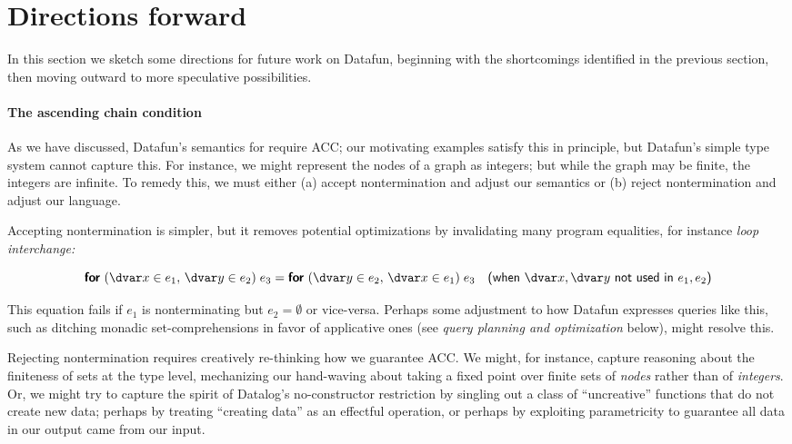 
\section{Directions forward}

\label{section-extensions}

In this section we sketch some directions for future work on Datafun, beginning with the shortcomings identified in the previous section, then moving outward to more speculative possibilities.

\paragraph{The ascending chain condition}

As we have discussed, Datafun's semantics for  require ACC; our motivating examples satisfy this in principle, but Datafun's simple type system cannot capture this. For instance, we might represent the nodes of a graph as integers; but while the graph may be finite, the integers are infinite. To remedy this, we must either (a) accept nontermination and adjust our semantics or (b) reject nontermination and adjust our language.

Accepting nontermination is simpler, but it removes potential optimizations by invalidating many program equalities, for instance \emph{loop interchange:}

\begin{equation*}
  \efor{\dvar x \in e_1,\, \dvar y \in e_2}{e_3}
  =
  \efor{\dvar y \in e_2,\, \dvar x \in e_1}{e_3}
  \quad\textsf{(when $\dvar x,\dvar y$ not used in $e_1,e_2$)}
\end{equation*}



\noindent
This equation fails if $e_1$ is nonterminating but $e_2 = \emptyset$ or
vice-versa. Perhaps some adjustment to how Datafun expresses queries like this, such as ditching monadic set-comprehensions in favor of applicative ones (see \emph{query planning and optimization} below), might resolve this.

Rejecting nontermination requires creatively re-thinking how we guarantee ACC.
We might, for instance, capture reasoning about the finiteness of sets at the
type level, mechanizing our hand-waving about taking a fixed point over finite
sets of \emph{nodes} rather than of \emph{integers}. Or, we might try to capture
the spirit of Datalog's no-constructor restriction by singling out a class of
``uncreative'' functions that do not create new data; perhaps by treating
``creating data'' as an effectful operation,\footnotemark{} or perhaps by exploiting parametricity to guarantee all data in our output came from our input.

